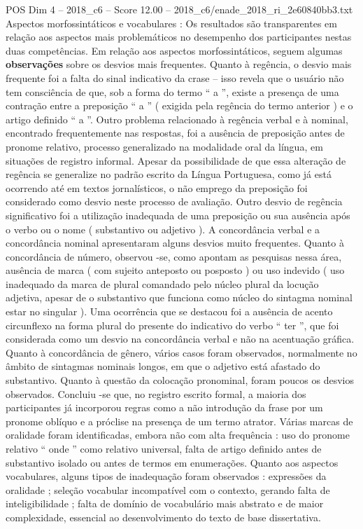 \begin{textsample}{POS Dim 4 – 2018\_c6 – Score 12.00 – 2018\_c6/enade\_2018\_ri\_2e60840bb3.txt}
Aspectos morfossintáticos e vocabulares : Os resultados são transparentes em relação aos aspectos mais problemáticos no desempenho dos participantes nestas duas competências.
Em relação aos aspectos morfossintáticos, seguem algumas \textbf{observações} sobre os desvios mais frequentes.
Quanto à regência, o desvio mais frequente foi a falta do sinal indicativo da crase – isso revela que o usuário não tem consciência de que, sob a forma do termo “ a ”, existe a presença de uma contração entre a preposição “ a ” ( exigida pela regência do termo anterior ) e o artigo definido “ a ”.
Outro problema relacionado à regência verbal e à nominal, encontrado frequentemente nas respostas, foi a ausência de preposição antes de pronome relativo, processo generalizado na modalidade oral da língua, em situações de registro informal.
Apesar da possibilidade de que essa alteração de regência se generalize no padrão escrito da Língua Portuguesa, como já está ocorrendo até em textos jornalísticos, o não emprego da preposição foi considerado como desvio neste processo de avaliação.
Outro desvio de regência significativo foi a utilização inadequada de uma preposição ou sua ausência após o verbo ou o nome ( substantivo ou adjetivo ).
A concordância verbal e a concordância nominal apresentaram alguns desvios muito frequentes.
Quanto à concordância de número, observou -se, como apontam as pesquisas nessa área, ausência de marca ( com sujeito anteposto ou posposto ) ou uso indevido ( uso inadequado da marca de plural comandado pelo núcleo plural da locução adjetiva, apesar de o substantivo que funciona como núcleo do sintagma nominal estar no singular ).
Uma ocorrência que se destacou foi a ausência de acento circunflexo na forma plural do presente do indicativo do verbo “ ter ”, que foi considerada como um desvio na concordância verbal e não na acentuação gráfica.
Quanto à concordância de gênero, vários casos foram observados, normalmente no âmbito de sintagmas nominais longos, em que o adjetivo está afastado do substantivo.
Quanto à questão da colocação pronominal, foram poucos os desvios observados.
Concluiu -se que, no registro escrito formal, a maioria dos participantes já incorporou regras como a não introdução da frase por um pronome oblíquo e a próclise na presença de um termo atrator.
Várias marcas de oralidade foram identificadas, embora não com alta frequência : uso do pronome relativo “ onde ” como relativo universal, falta de artigo definido antes de substantivo isolado ou antes de termos em enumerações.
Quanto aos aspectos vocabulares, alguns tipos de inadequação foram observados : expressões da oralidade ; seleção vocabular incompatível com o contexto, gerando falta de inteligibilidade ; falta de domínio de vocabulário mais abstrato e de maior complexidade, essencial ao desenvolvimento do texto de base dissertativa.

\end{textsample}
